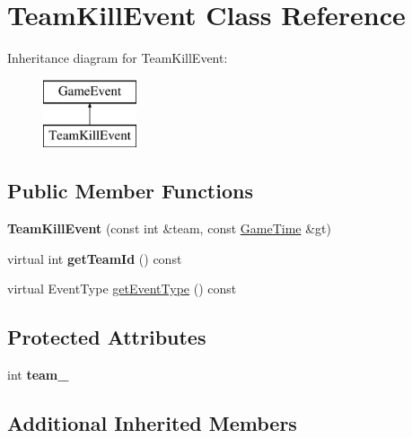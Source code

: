 \hypertarget{class_team_kill_event}{}\section{Team\+Kill\+Event Class Reference}
\label{class_team_kill_event}
Inheritance diagram for Team\+Kill\+Event\+:\begin{figure}[H]
\begin{center}
\leavevmode
\includegraphics[height=2.000000cm]{class_team_kill_event}
\end{center}
\end{figure}
\subsection*{Public Member Functions}
\begin{DoxyCompactItemize}
\item 
{\bfseries Team\+Kill\+Event} (const int \&team, const \hyperlink{class_game_time}{Game\+Time} \&gt)\hypertarget{class_team_kill_event_a94491b537a05c312981a99ef1f25132b}{}\label{class_team_kill_event_a94491b537a05c312981a99ef1f25132b}

\item 
virtual int {\bfseries get\+Team\+Id} () const \hypertarget{class_team_kill_event_a0b4fbe764bcf1cb0fbe01b45bb9b4d4b}{}\label{class_team_kill_event_a0b4fbe764bcf1cb0fbe01b45bb9b4d4b}

\item 
virtual Event\+Type \hyperlink{class_team_kill_event_a5767fd00879f1e0e41909742bf94d979}{get\+Event\+Type} () const 
\end{DoxyCompactItemize}
\subsection*{Protected Attributes}
\begin{DoxyCompactItemize}
\item 
int {\bfseries team\+\_\+}\hypertarget{class_team_kill_event_ac774afe46a188294965a2a5785cb91e7}{}\label{class_team_kill_event_ac774afe46a188294965a2a5785cb91e7}

\end{DoxyCompactItemize}
\subsection*{Additional Inherited Members}


